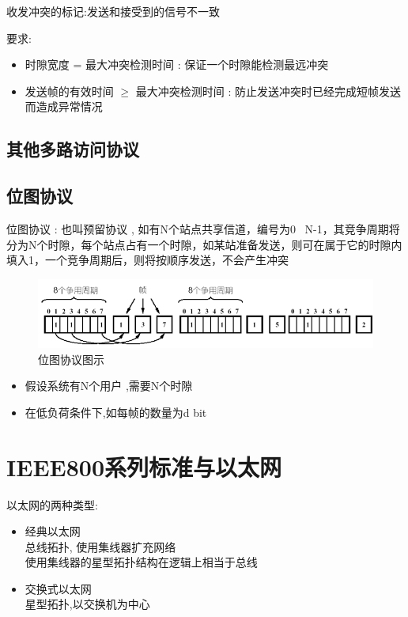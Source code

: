 \documentclass[UTF8,a4paper]{ctexart}
\begin{document}
收发冲突的标记:发送和接受到的信号不一致

要求:
\begin{itemize}
  \item 时隙宽度 = 最大冲突检测时间 : 保证一个时隙能检测最远冲突
  \item 发送帧的有效时间 $\geq$ 最大冲突检测时间 : 防止发送冲突时已经完成短帧发送而造成异常情况
\end{itemize}

\subsection{其他多路访问协议}
\subsection{位图协议}
位图协议 : 也叫预留协议 , 如有N个站点共享信道，编号为0 ~N-1，其竞争周期将分为N个时隙，每个站点占有一个时隙，如某站准备发送，则可在属于它的时隙内填入1，一个竞争周期后，则将按顺序发送，不会产生冲突
\begin{figure}[H]
  \centering
  \includegraphics[scale = 0.3]{assets/jisuanjiwangluo_27209.png}
  \caption{位图协议图示}
\end{figure}

\begin{itemize}
  \item 假设系统有N个用户 ,需要N个时隙
  \item 在低负荷条件下,如每帧的数量为d bit
\end{itemize}

\section{IEEE800系列标准与以太网}
以太网的两种类型:
\begin{itemize}
  \item 经典以太网\\
  总线拓扑, 使用集线器扩充网络\\
  使用集线器的星型拓扑结构在逻辑上相当于总线
  \item 交换式以太网\\
  星型拓扑,以交换机为中心
\end{itemize}
\end{document}
